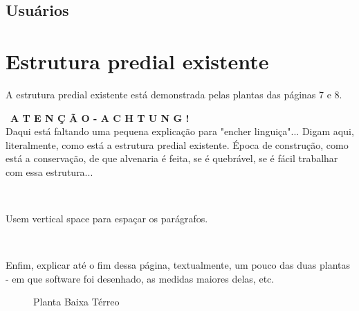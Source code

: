 \documentclass[	DIV=calc,%
							paper=a4,%
							fontsize=12pt,%
							onecolumn]{scrartcl}	 					%
\begin{document}
\subsection{Usuários}



\section{Estrutura predial existente}

A estrutura predial existente está demonstrada pelas plantas das páginas 7 e 8.

\
\textbf{A T E N Ç Ã O - A C H T U N G !}
\\
Daqui está faltando uma pequena explicação para "encher linguiça"... Digam aqui, literalmente, como está a estrutura predial existente. Época de construção, como está a conservação, de que alvenaria é feita, se é quebrável, se é fácil trabalhar com essa estrutura... 

\

Usem vertical space  para espaçar os parágrafos.

\

Enfim, explicar até o fim dessa página, textualmente, um pouco das duas plantas - em que software foi desenhado, as medidas maiores delas, etc.



\clearpage 
\thispagestyle{plain}
\recalctypearea
\begin{figure}
	\noindent{}
	\caption[Planta Baixa Térreo]{Planta Baixa Térreo}
	\label{figura1}
\end{figure}
\end{document}

